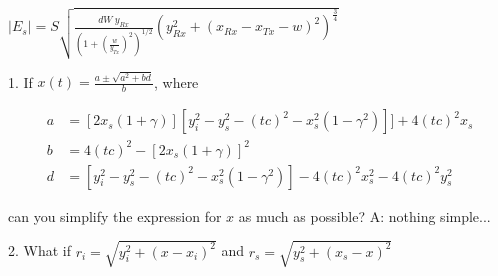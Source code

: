 $ \vert E_s \vert = S \sqrt{ \frac{dW \ y_{Rx}}{(1+(\frac{w}{y_{Tx}})^2)^{1/2}}
(y^2_{Rx} + (x_{Rx} - x_{Tx} - w)^2)^{\frac{3}{4}}} $

1. If $ x(t) = \frac{a \pm \sqrt{a^2 + bd}}{b} $, where

\begin{align*}
   a &= [ 2x_s ( 1 + \gamma ) ][ y^2_i - y^2_s - (tc)^2 - x^2_s (1 -\gamma^2 ) ] ] + 4(tc)^2 x_s \\
   b &= 4(tc)^2 - [ 2x_s (1+ \gamma) ]^2 \\
   d &= [ y^2_i - y^2_s - (tc)^2 - x^2_s (1 -\gamma^2 ) ] - 4(tc)^2 x^2_s - 4(tc)^2 y^2_s
\end{align*}

can you simplify the expression for $x$ as much as possible?
A: nothing simple...

2. What if $r_i = \sqrt{y^2_i + (x-x_i)^2} $ and $r_s = \sqrt{y^2_s + (x_s-x)^2}$
